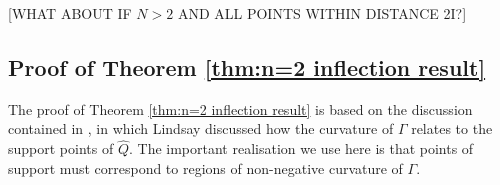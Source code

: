 
		[WHAT ABOUT IF $N>2$ AND ALL POINTS WITHIN DISTANCE 2I?]

		\subsection{Proof of Theorem \ref{thm:n=2 inflection result}}
		The proof of Theorem \ref{thm:n=2 inflection result} is based on the discussion contained in \cite[Section 4]{Lindsay1983a-he}, in which Lindsay discussed how the curvature of $\Gamma$ relates to the support points of $\hat{Q}$. The important realisation we use here is that points of support must correspond to regions of non-negative curvature of $\Gamma$.

